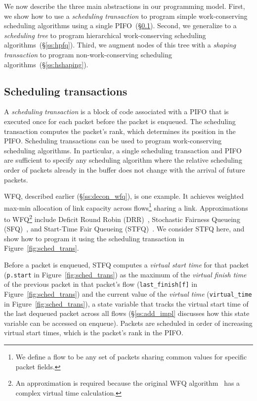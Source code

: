 We now describe the three main abstractions in our programming model. First, we
show how to use a {\em scheduling transaction} to program simple
work-conserving scheduling algorithms using a single PIFO~(\S\ref{ss:wfq}).
Second, we generalize to a {\em scheduling tree} to program hierarchical
work-conserving scheduling algorithms~(\S\ref{ss:hpfq}). Third, we augment
nodes of this tree with a {\em shaping transaction} to program
non-work-conserving scheduling algorithms~(\S\ref{ss:hshaping}).

\subsection{Scheduling transactions}
\label{ss:wfq}

A {\em scheduling transaction} is a block of code associated with a PIFO that
is executed once for each packet before the packet is enqueued. The scheduling
transaction computes the packet's rank, which determines its position in the
PIFO. Scheduling transactions can be used to program work-conserving scheduling
algorithms. In particular, a single scheduling transaction and PIFO are
sufficient to specify any scheduling algorithm where the relative scheduling
order of packets already in the buffer does not change with the arrival of
future packets.

WFQ, described earlier (\S\ref{ss:decon_wfq}), is one example. It achieves
weighted max-min allocation of link capacity across flows\footnote{We define a
flow to be any set of packets sharing common values for specific packet
fields.} sharing a link.  Approximations to WFQ\footnote{An approximation
is required because the original WFQ algorithm~\cite{wfq} has a complex virtual
time calculation.} include Deficit Round Robin (DRR)~\cite{drr}, Stochastic
Fairness Queueing (SFQ)~\cite{sfq}, and Start-Time Fair Queueing
(STFQ)~\cite{stfq}. We consider STFQ here, and show how to program it using the
scheduling transaction in Figure~\ref{fig:sched_trans}.


Before a packet is enqueued, STFQ computes a {\em virtual start time}
for that packet (\texttt{p.start} in Figure~\ref{fig:sched_trans}) as
the maximum of the {\em virtual finish time} of the previous packet in
that packet's flow (\texttt{last\_finish[f]} in
Figure~\ref{fig:sched_trans}) and the current value of the {\em
  virtual time} (\texttt{virtual\_time} in Figure~\ref{fig:sched_trans}), a state variable that tracks the virtual
start time of the last dequeued packet across all flows
(\S\ref{ss:add_impl} discusses how this state variable can be accessed
on enqueue). Packets are scheduled in order of increasing virtual
start times, which is the packet's rank in the PIFO.

